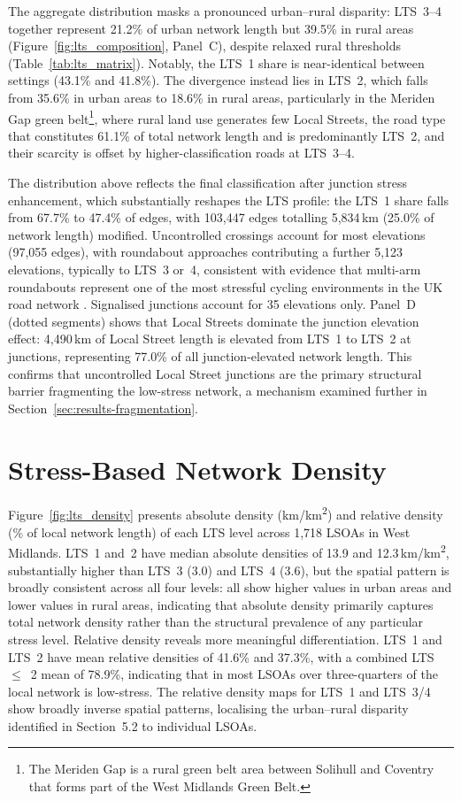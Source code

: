 The aggregate distribution masks a pronounced urban--rural disparity:
LTS~3--4 together represent 21.2\% of urban network length but 39.5\%
in rural areas (Figure~\ref{fig:lts_composition}, Panel~C), despite relaxed rural thresholds
(Table~\ref{tab:lts_matrix}). Notably, the LTS~1 share is near-identical between
settings (43.1\% and 41.8\%). The divergence instead lies in LTS~2,
which falls from 35.6\% in urban areas to 18.6\% in rural areas,
particularly in the Meriden Gap green
belt\footnote{The Meriden Gap is a rural green belt area between
Solihull and Coventry that forms part of the West Midlands Green
Belt.}, where rural land use generates few Local Streets, the road
type that constitutes 61.1\% of total network length and is
predominantly LTS~2, and their scarcity is offset by
higher-classification roads at LTS~3--4.

The distribution above reflects the final classification after
junction stress enhancement, which substantially reshapes the LTS
profile: the LTS~1 share falls from 67.7\% to 47.4\% of edges, with
103,447 edges totalling 5,834\,km (25.0\% of network length)
modified. Uncontrolled crossings account for most elevations (97,055
edges), with roundabout approaches contributing a further 5,123
elevations, typically to LTS~3 or~4, consistent with evidence that
multi-arm roundabouts represent one of the most stressful cycling
environments in the UK road network \parencite{davies1997,reid2011,departmentfortransport2024}. Signalised junctions account for 35 elevations only. Panel~D (dotted segments) shows that Local Streets dominate
the junction elevation effect: 4,490\,km of Local Street length is
elevated from LTS~1 to LTS~2 at junctions, representing 77.0\% of
all junction-elevated network length. This confirms that uncontrolled
Local Street junctions are the primary structural barrier fragmenting
the low-stress network, a mechanism examined further in
Section~\ref{sec:results-fragmentation}.

\section{Stress-Based Network Density}
\label{sec:results-density}

Figure~\ref{fig:lts_density} presents absolute density (km/km\textsuperscript{2}) and
relative density (\% of local network length) of each LTS level
across 1,718 LSOAs in West Midlands. LTS~1 and~2 have median
absolute densities of 13.9 and 12.3\,km/km\textsuperscript{2},
substantially higher than LTS~3 (3.0) and LTS~4 (3.6), but the
spatial pattern is broadly consistent across all four levels: all
show higher values in urban areas and lower values in rural areas,
indicating that absolute density primarily captures total network
density rather than the structural prevalence of any particular
stress level. Relative density reveals more meaningful
differentiation. LTS~1 and LTS~2 have mean relative densities of
41.6\% and 37.3\%, with a combined LTS~$\leq$~2 mean of 78.9\%,
indicating that in most LSOAs over three-quarters of the local
network is low-stress. The relative density maps for LTS~1 and
LTS~3/4 show broadly inverse spatial patterns, localising the
urban--rural disparity identified in Section~5.2 to individual LSOAs.

